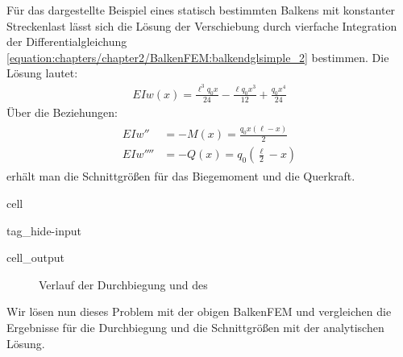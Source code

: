 \documentclass[letterpaper,10pt,german]{jupyterBook}
\begin{document}
\sphinxAtStartPar
Für das dargestellte Beispiel eines statisch bestimmten Balkens mit konstanter Streckenlast lässt sich die Lösung der Verschiebung durch vierfache Integration der Differentialgleichung \eqref{equation:chapters/chapter2/BalkenFEM:balkendglsimple_2} bestimmen. Die Lösung lautet:
\begin{equation}\label{equation:chapters/chapter2/BalkenFEM:Balken_example_01}
\begin{split}EI w(x) =\frac{\ell^{3} q_{0} x}{24} - \frac{\ell q_{0} x^{3}}{12} + \frac{q_{0} x^{4}}{24}\end{split}
\end{equation}
\sphinxAtStartPar
Über die Beziehungen:
\begin{equation}\label{equation:chapters/chapter2/BalkenFEM:Balken_example_02}
\begin{split}\begin{align}
EI w'' & =-M(x) =  \frac{q_{0} x \left(\ell - x\right)}{2} \\
EI w'''' &= -Q(x) = q_{0} \left(\frac{\ell}{2} - x\right)
\end{align}\end{split}
\end{equation}
\sphinxAtStartPar
erhält man die Schnittgrößen für das Biegemoment und die Querkraft.

\begin{sphinxuseclass}{cell}
\begin{sphinxuseclass}{tag_hide-input}\begin{sphinxVerbatimOutput}

\begin{sphinxuseclass}{cell_output}
\begin{figure}[htbp]
\centering
\capstart

\noindent{}
\caption{Verlauf der Durchbiegung und des}\label{\detokenize{chapters/chapter2/BalkenFEM:schnittgroszen-balken}}\end{figure}

\end{sphinxuseclass}\end{sphinxVerbatimOutput}

\end{sphinxuseclass}
\end{sphinxuseclass}
\sphinxAtStartPar
Wir lösen nun dieses Problem mit der obigen Balken\sphinxhyphen{}FEM und vergleichen die Ergebnisse für die Durchbiegung und die Schnittgrößen mit der analytischen Lösung.
\end{document}

